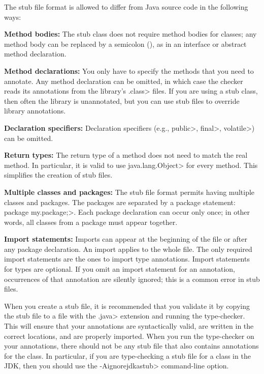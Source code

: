 The stub file format is allowed to differ from Java source code in the
following ways:
\begin{description}

\item{\textbf{Method bodies:}}
  The stub class does not require method bodies for classes; any method
  body can be replaced by a semicolon (\code{;}), as in an interface or
  abstract method declaration.

\item{\textbf{Method declarations:}}
  You only have to specify the methods that you need to annotate.
  Any method declaration can be omitted, in which case the checker reads
  its annotations from the library's \<.class> files.  If you are using a stub class, then
  often the library is unannotated, but you can use stub files to override
  library annotations.

\item{\textbf{Declaration specifiers:}}
  Declaration specifiers (e.g., \<public>, \<final>, \<volatile>)
  can be omitted.

\item{\textbf{Return types:}}
  The return type of a method does not need to match the real method.
  In particular, it is valid to use \<java.lang.Object> for every method.
  This simplifies the creation of stub files.

\item{\textbf{Multiple classes and packages:}}
  The stub file format permits having multiple classes and packages.
  The packages are separated by a package statement:
  \<package my.package;>.  Each package declaration can occur only once; in
  other words, all classes from a package must appear together.

\item{\textbf{Import statements:}}
  Imports can appear at the beginning of the file or after any package declaration.
  An import applies to the whole file.
  The only required import statements are the ones to import type
  annotations.  Import statements for types are optional.  If you omit an
  import statement for an annotation, occurrences of that annotation are
  silently ignored; this is a common error in stub files.

\end{description}

When you create a stub file, it is recommended that you validate it by copying
the stub file to a file with the \<.java> extension and running the
type-checker.  This will ensure that your annotations are syntactically
valid, are written in the correct locations, and are properly imported.
When you run the type-checker on your annotations, there should not be any
stub file that also contains annotations for the class.  In particular, if
you are type-checking a stub file for a class in the JDK, then you should
use the \<-Aignorejdkastub> command-line option.


